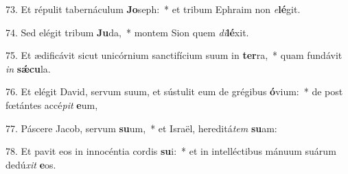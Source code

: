 73. Et répulit tabernáculum \textbf{Jo}seph:~*  et tribum Ephraim non \textit{e}\textbf{lé}git.\

74. Sed elégit tribum \textbf{Ju}da,~*  montem Sion quem \textit{di}\textbf{lé}xit.\

75. Et ædificávit sicut unicórnium sanctifícium suum in \textbf{ter}ra,~*  quam fundávit \textit{in} \textbf{sǽ}\textbf{cu}la.\

76. Et elégit David, servum suum, et sústulit eum de grégibus \textbf{ó}vium:~*  de post fœtántes accé\textit{pit} \textbf{e}um,\

77. Páscere Jacob, servum \textbf{su}um,~*  et Israël, hereditá\textit{tem} \textbf{su}am:\

78. Et pavit eos in innocéntia cordis \textbf{su}i:~*  et in intelléctibus mánuum suárum dedú\textit{xit} \textbf{e}os.\

